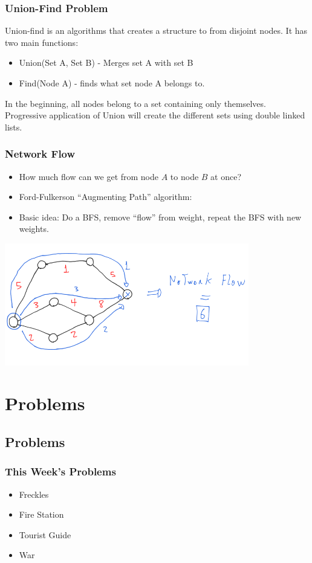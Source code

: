 \documentclass{beamer}
\begin{document}
\begin{frame}
  \frametitle{Union-Find Problem}
  {\small
  Union-find is an algorithms that creates a structure to
   from disjoint nodes. It has two main
  functions:

  \smallskip

  \begin{itemize}
    \item Union(Set A, Set B) - Merges set A with set B
    \item Find(Node A) - finds what set node A belongs to.
  \end{itemize}

  \bigskip

  In the beginning, all nodes belong to a set containing only
  themselves. Progressive application of Union will create the
  different sets using double linked lists.
  }
\end{frame}

\begin{frame}
  \frametitle{Network Flow}
  \begin{itemize}
  \item How much flow can we get from node $A$ to node $B$ at once?
  \item Ford-Fulkerson ``Augmenting Path'' algorithm:
  \item Basic idea: Do a BFS, remove ``flow'' from weight, repeat the BFS with new weights.
  \end{itemize}
  \begin{center}
    \includegraphics[width=0.8\textwidth]{img/netflow}
  \end{center}

\end{frame}

\section{Problems}
\subsection{Problems}
\begin{frame}
  \frametitle{This Week's Problems}
  \begin{itemize}
    \item Freckles
    \item Fire Station
    \item Tourist Guide
    \item War
  \end{itemize}


\end{frame}
\end{document}
